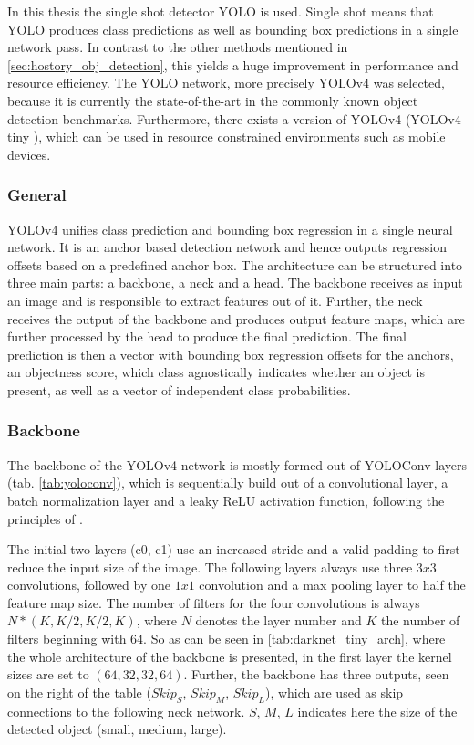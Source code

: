 \label{sec:yolo}

In this thesis the single shot detector \ac{YOLO} \cite{yolov1} is used.
Single shot means that \ac{YOLO} produces class predictions as well as bounding box predictions in a single network pass.
In contrast to the other methods mentioned in \ref{sec:hostory_obj_detection}, this yields a huge improvement in performance and resource efficiency.
The \ac{YOLO} network, more precisely \ac{YOLOv4} \cite{yolov4} was selected, because it is currently the state-of-the-art in the commonly known object detection benchmarks.
Furthermore, there exists a version of \ac{YOLOv4} (YOLOv4-tiny \cite{yolov4_tiny}), which can be used in resource constrained environments such as mobile devices.

\subsubsection{General}

\ac{YOLOv4} unifies class prediction and bounding box regression in a single neural network.
It is an anchor based detection network and hence outputs regression offsets based on a predefined anchor box.
The architecture can be structured into three main parts: a backbone, a neck and a head.
The backbone receives as input an image and is responsible to extract features out of it.
Further, the neck receives the output of the backbone and produces output feature maps, which are further processed by the head to produce the final prediction.
The final prediction is then a vector with bounding box regression offsets for the anchors, an objectness score, which class agnostically indicates whether an object is present, as well as a vector of independent class probabilities.

\subsubsection{Backbone}

The backbone of the \ac{YOLOv4} network is mostly formed out of YOLOConv layers (tab. \ref{tab:yoloconv}), which is sequentially build out of a convolutional layer, a batch normalization layer and a leaky \ac{ReLU} activation function, following the principles of \cite{batchnorm}.

The initial two layers (c0, c1) use an increased stride and a valid padding to first reduce the input size of the image.
The following layers always use three $3x3$ convolutions, followed by one $1x1$ convolution and a max pooling layer to half the feature map size.
The number of filters for the four convolutions is always $N * (K, K/2, K/2, K)$, where $N$ denotes the layer number and $K$ the number of filters beginning with $64$.
So as can be seen in \ref{tab:darknet_tiny_arch}, where the whole architecture of the backbone is presented, in the first layer the kernel sizes are set to $(64, 32, 32, 64)$.
Further, the backbone has three outputs, seen on the right of the table ($Skip_S$, $Skip_M$, $Skip_L$), which are used as skip connections to the following neck network.
$S$, $M$, $L$ indicates here the size of the detected object (small, medium, large).


